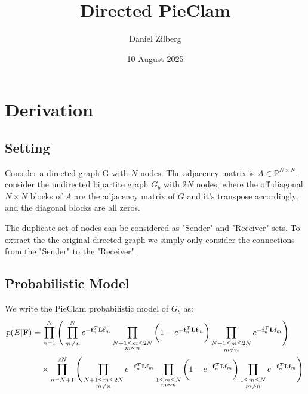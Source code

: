 \documentclass{article}
\begin{document}
\title{Directed PieClam}
\author{Daniel Zilberg}
\date{10 August 2025}

\maketitle

\section{Derivation}
\subsection{Setting}
Consider a directed graph G with $N$ nodes. The adjacency matrix is $A \in \mathbb{R}^{N \times N}$. consider the undirected bipartite graph $G_b$ with $2N$ nodes, where the off diagonal $N\times N$ blocks of $A$ are the adjacency matrix of $G$ and it's transpose accordingly, and the diagonal blocks are all zeros. 

The duplicate set of nodes can be considered as "Sender" and "Receiver" sets. To extract the the original directed graph we simply only consider the connections from the "Sender" to the "Receiver".

\subsection{Probabilistic Model}
We write the PieClam probabilistic model of $G_b$ as:
\begin{align}
    p(E|\mathbf{F}) &= \prod_{n=1}^{N} \Bigg(
    \prod_{m\not=n}^{N}e^{-\mathbf{f}_n^T \mathbf{L} \mathbf{f}_m} 
    \prod_{\substack{N+1\leq m\leq 2N \\ m \sim n}}\bigg(1-e^{-\mathbf{f}_n^T \mathbf{L} \mathbf{f}_m}\bigg)
    \prod_{\substack{N+1\leq m\leq 2N \\ m \not\sim n}}e^{-\mathbf{f}_n^T \mathbf{L} \mathbf{f}_m}
    \Bigg) \notag \\
    &\quad \times \prod_{n=N+1}^{2N}\Bigg(
        \prod_{\substack{N+1\leq m\leq 2N \\ m \not= n}}e^{-\mathbf{f}_n^T \mathbf{L} \mathbf{f}_m} 
        \prod_{\substack{1\leq m\leq N \\ m \sim n}}\bigg(1-e^{-\mathbf{f}_n^T \mathbf{L} \mathbf{f}_m}\bigg)
        \prod_{\substack{1\leq m\leq N \\ m \not\sim n}}e^{-\mathbf{f}_n^T \mathbf{L} \mathbf{f}_m}
        \Bigg)
    \label{eq:big_bipartite}
\end{align}
\end{document}
